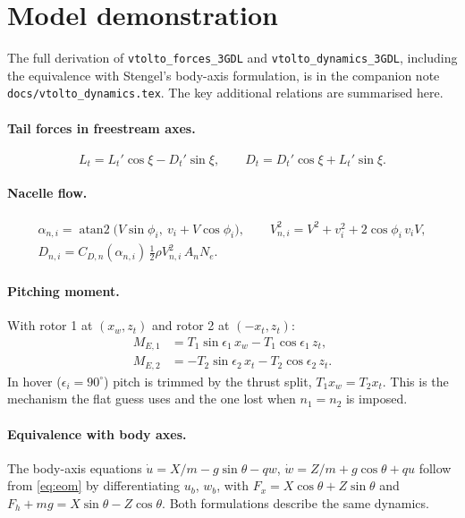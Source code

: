 \documentclass[11pt,a4paper]{article}
\newcommand{\code}[1]{\texttt{\small #1}}
\begin{document}
\appendix

\section{Model demonstration}\label{app:model}
The full derivation of \code{vtolto\_forces\_3GDL} and \code{vtolto\_dynamics\_3GDL}, including the
equivalence with Stengel's body-axis formulation, is in the companion note
\code{docs/vtolto\_dynamics.tex}. The key additional relations are summarised here.

\paragraph{Tail forces in freestream axes.}
\begin{equation}
L_t = L_t'\cos\xi - D_t'\sin\xi, \qquad D_t = D_t'\cos\xi + L_t'\sin\xi .
\end{equation}

\paragraph{Nacelle flow.}
\begin{gather}
\alpha_{n,i} = \operatorname{atan2}\!\big(V\sin\phi_i,\ v_i + V\cos\phi_i\big), \qquad
V_{n,i}^2 = V^2 + v_i^2 + 2\cos\phi_i\, v_i V, \\
D_{n,i} = C_{D,n}(\alpha_{n,i})\,\tfrac12\rho V_{n,i}^2\, A_n N_e .
\end{gather}

\paragraph{Pitching moment.} With rotor 1 at $(x_w, z_t)$ and rotor 2 at $(-x_t, z_t)$:
\begin{align}
M_{E,1} &= T_1\sin\epsilon_1\, x_w - T_1\cos\epsilon_1\, z_t, \\
M_{E,2} &= -T_2\sin\epsilon_2\, x_t - T_2\cos\epsilon_2\, z_t .
\end{align}
In hover ($\epsilon_i = 90^\circ$) pitch is trimmed by the thrust split, $T_1 x_w = T_2 x_t$.
This is the mechanism the flat guess uses and the one lost when $n_1 = n_2$ is imposed.

\paragraph{Equivalence with body axes.} The body-axis equations
$\dot u = X/m - g\sin\theta - qw$, $\dot w = Z/m + g\cos\theta + qu$ follow from \eqref{eq:eom} by
differentiating $u_b$, $w_b$, with $F_x = X\cos\theta + Z\sin\theta$ and
$F_h + mg = X\sin\theta - Z\cos\theta$. Both formulations describe the same dynamics.
\end{document}
